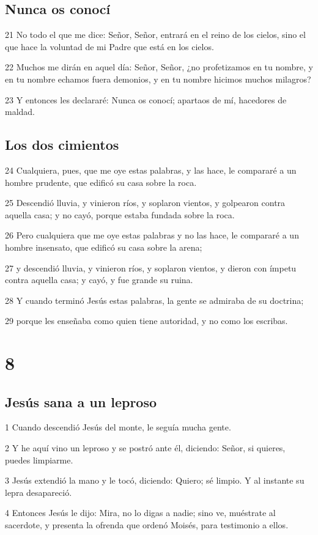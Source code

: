 \section*{Nunca os conocí}

\par 21 No todo el que me dice: Señor, Señor, entrará en el reino de los cielos, sino el que hace la voluntad de mi Padre que está en los cielos.
\par 22 Muchos me dirán en aquel día: Señor, Señor, ¿no profetizamos en tu nombre, y en tu nombre echamos fuera demonios, y en tu nombre hicimos muchos milagros?
\par 23 Y entonces les declararé: Nunca os conocí; apartaos de mí, hacedores de maldad.

\section*{Los dos cimientos}

\par 24 Cualquiera, pues, que me oye estas palabras, y las hace, le compararé a un hombre prudente, que edificó su casa sobre la roca.
\par 25 Descendió lluvia, y vinieron ríos, y soplaron vientos, y golpearon contra aquella casa; y no cayó, porque estaba fundada sobre la roca.
\par 26 Pero cualquiera que me oye estas palabras y no las hace, le compararé a un hombre insensato, que edificó su casa sobre la arena;
\par 27 y descendió lluvia, y vinieron ríos, y soplaron vientos, y dieron con ímpetu contra aquella casa; y cayó, y fue grande su ruina.
\par 28 Y cuando terminó Jesús estas palabras, la gente se admiraba de su doctrina;
\par 29 porque les enseñaba como quien tiene autoridad, y no como los escribas.

\chapter{8}

\section*{Jesús sana a un leproso}

\par 1 Cuando descendió Jesús del monte, le seguía mucha gente.
\par 2 Y he aquí vino un leproso y se postró ante él, diciendo: Señor, si quieres, puedes limpiarme.
\par 3 Jesús extendió la mano y le tocó, diciendo: Quiero; sé limpio. Y al instante su lepra desapareció.
\par 4 Entonces Jesús le dijo: Mira, no lo digas a nadie; sino ve, muéstrate al sacerdote, y presenta la ofrenda que ordenó Moisés, para testimonio a ellos.


